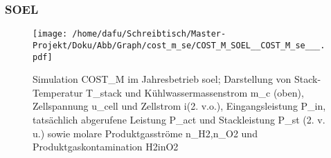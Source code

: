 \documentclass[onecolumn,10pt,titlepage]{article}
\begin{document}
\subsubsection{SOEL}
\begin{figure}
	\centering
	\texttt{[image: /home/dafu/Schreibtisch/Master-Projekt/Doku/Abb/Graph/cost\_m\_se/COST\_M\_SOEL\_\_COST\_M\_se\_\_\_.pdf]}
	
	\caption[Simulation COST\_M im Jahresbetrieb \gls{soel}]{Simulation COST\_M im Jahresbetrieb \gls{soel}; Darstellung von Stack-Temperatur \gls{T_stack} und Kühlwassermassenstrom \gls{m_c} (oben), Zellspannung \gls{u_cell} und Zellstrom \gls{i}(2. v.o.), Eingangsleistung \gls{P_in},  tatsächlich abgerufene Leistung \gls{P_act} und Stackleistung \gls{P_st} (2. v. u.) sowie molare Produktgasströme \gls{n_H2},\gls{n_O2} und Produktgaskontamination \gls{H2inO2}}
	\label{fig:plt_se_COST_SOEL} 
\end{figure}
\end{document}
